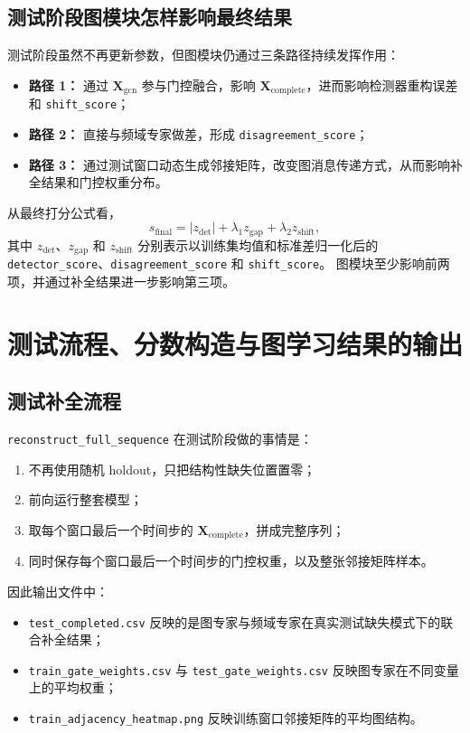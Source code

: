 \documentclass[UTF8]{ctexart}
\begin{document}
\subsection{测试阶段图模块怎样影响最终结果}

测试阶段虽然不再更新参数，但图模块仍通过三条路径持续发挥作用：
\begin{itemize}
    \item \textbf{路径 1：} 通过 \(\bm{X}_{\text{gcn}}\) 参与门控融合，影响 \(\bm{X}_{\text{complete}}\)，进而影响检测器重构误差和 \texttt{shift\_score}；
    \item \textbf{路径 2：} 直接与频域专家做差，形成 \texttt{disagreement\_score}；
    \item \textbf{路径 3：} 通过测试窗口动态生成邻接矩阵，改变图消息传递方式，从而影响补全结果和门控权重分布。
\end{itemize}

从最终打分公式看，
\begin{equation}
    s_{\text{final}}
    =
    \left|z_{\text{det}}\right|
    + \lambda_{1} z_{\text{gap}}
    + \lambda_{2} z_{\text{shift}},
\end{equation}
其中 \(z_{\text{det}}\)、\(z_{\text{gap}}\) 和 \(z_{\text{shift}}\) 分别表示以训练集均值和标准差归一化后的
\texttt{detector\_score}、\texttt{disagreement\_score} 和 \texttt{shift\_score}。
图模块至少影响前两项，并通过补全结果进一步影响第三项。

\section{测试流程、分数构造与图学习结果的输出}

\subsection{测试补全流程}

\texttt{reconstruct\_full\_sequence} 在测试阶段做的事情是：
\begin{enumerate}
    \item 不再使用随机 holdout，只把结构性缺失位置置零；
    \item 前向运行整套模型；
    \item 取每个窗口最后一个时间步的 \(\bm{X}_{\text{complete}}\)，拼成完整序列；
    \item 同时保存每个窗口最后一个时间步的门控权重，以及整张邻接矩阵样本。
\end{enumerate}

因此输出文件中：
\begin{itemize}
    \item \texttt{test\_completed.csv} 反映的是图专家与频域专家在真实测试缺失模式下的联合补全结果；
    \item \texttt{train\_gate\_weights.csv} 与 \texttt{test\_gate\_weights.csv} 反映图专家在不同变量上的平均权重；
    \item \texttt{train\_adjacency\_heatmap.png} 反映训练窗口邻接矩阵的平均图结构。
\end{itemize}
\end{document}
